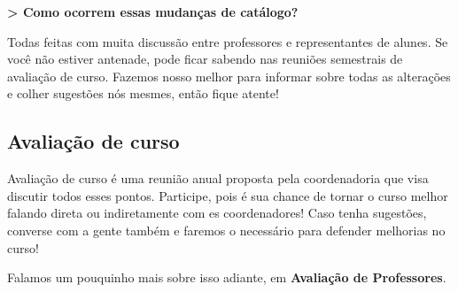 \textbf{> Como ocorrem essas mudanças de catálogo?}

Todas feitas com muita discussão entre professores e representantes de alunes. Se
você não estiver antenade, pode ficar sabendo nas reuniões semestrais de avaliação de
curso. Fazemos nosso melhor para informar sobre todas as alterações e colher sugestões
nós mesmes, então fique atente!

\subsection{Avaliação de curso}

Avaliação de curso é uma reunião anual proposta pela coordenadoria que visa discutir todos esses pontos. Participe, pois é sua chance de tornar o curso melhor falando direta ou indiretamente com es coordenadores! Caso tenha sugestões, converse com a gente também e faremos o necessário para defender melhorias no curso!

Falamos um pouquinho mais sobre isso adiante, em \textbf{Avaliação de Professores}.